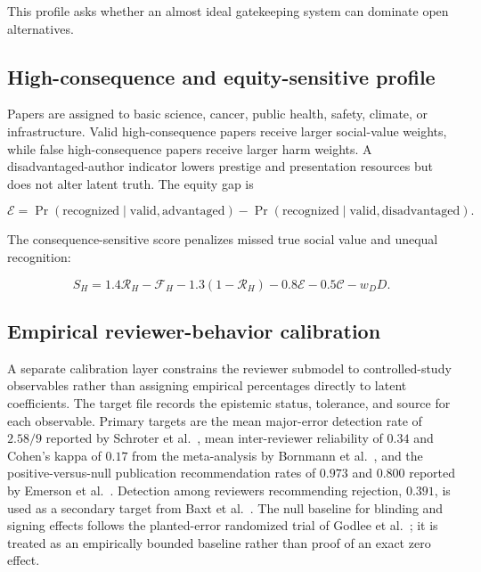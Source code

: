 \documentclass[11pt]{article}
\begin{document}
This profile asks whether an almost ideal gatekeeping system can dominate open alternatives.

\subsection{High-consequence and equity-sensitive profile}

Papers are assigned to basic science, cancer, public health, safety, climate, or infrastructure. Valid high-consequence papers receive larger social-value weights, while false high-consequence papers receive larger harm weights. A disadvantaged-author indicator lowers prestige and presentation resources but does not alter latent truth. The equity gap is

\begin{equation}
\mathcal{E}
=
\Pr(\mathrm{recognized}\mid\mathrm{valid,advantaged})
-
\Pr(\mathrm{recognized}\mid\mathrm{valid,disadvantaged}).
\end{equation}

The consequence-sensitive score penalizes missed true social value and unequal recognition:

\begin{equation}
S_H
=1.4\mathcal{R}_H
-\mathcal{F}_H
-1.3(1-\mathcal{R}_H)
-0.8\mathcal{E}
-0.5\mathcal{C}
-w_DD.
\end{equation}

\subsection{Empirical reviewer-behavior calibration}

A separate calibration layer constrains the reviewer submodel to controlled-study observables rather than assigning empirical percentages directly to latent coefficients. The target file records the epistemic status, tolerance, and source for each observable. Primary targets are the mean major-error detection rate of $2.58/9$ reported by Schroter et al.~\cite{schroter2008}, mean inter-reviewer reliability of $0.34$ and Cohen's kappa of $0.17$ from the meta-analysis by Bornmann et al.~\cite{bornmann2010}, and the positive-versus-null publication recommendation rates of $0.973$ and $0.800$ reported by Emerson et al.~\cite{emerson2010}. Detection among reviewers recommending rejection, $0.391$, is used as a secondary target from Baxt et al.~\cite{baxt1998}. The null baseline for blinding and signing effects follows the planted-error randomized trial of Godlee et al.~\cite{godlee1998}; it is treated as an empirically bounded baseline rather than proof of an exact zero effect.
\end{document}
